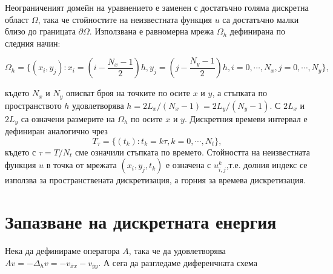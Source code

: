 \documentclass{article}
\begin{document}
Неограниченият домейн на уравнението е заменен с достатъчно голяма дискретна област $\Omega$, така че стойностите на неизвестната функция $u$ са достатъчно малки близо до границата $\partial \Omega$. Използвана е равномерна мрежа  $\Omega_h$ дефинирана по следния начин:

$$
\Omega_h = \{(x_i,y_j): x_i = (i-\frac{N_x-1}{2})h, y_j = (j-\frac{N_y-1}{2})h, i = 0,\cdots, N_x, j = 0 ,\cdots , N_y \},
$$

където $N_x$ и $N_y$ описват броя на точките по осите $x$ и $y$, а стъпката по пространството $h$ удовлетворява $h =2 L_x/(N_x-1) =2 L_y/(N_y-1)$.
С $2 L_x$ и $2 L_y$ са означени размерите на $\Omega_h$ по осите $x$ и $y$. Дискретния времеви интервал е дефиниран аналогично чрез
$$
T_{\tau} = \{(t_k): t_k = k\tau, k = 0,\cdots ,N_t \},
$$
където с $\tau = T/N_t$ сме означили стъпката по времето. Стойността на неизвестната функция $u$ в точка от мрежата $(x_i,y_j,t_k)$ е означена с $u_{i,j}^k$,т.е. долния индекс се използва за пространствената дискретизация, а горния за времева дискретизация.

\section{Запазване на дискретната енергия}
Нека да дефинираме оператора $A$, така че да удовлетворява $Av=-\Delta_h v=-v_{\bar{x}x} - v_{\bar{y}y}$. А сега да разгледаме диференчната схема
\end{document}
